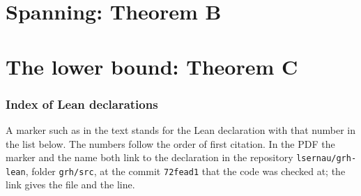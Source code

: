 \part{Spanning: Theorem B}


\part{The lower bound: Theorem C}



\appendix
{}

\section{Index of Lean declarations}\label{sec:app-leanindex}

A marker such as  in the text stands for the Lean declaration with that number in
the list below. The numbers follow the order of first citation. In the PDF the marker and the
name both link to the declaration in the repository \texttt{lsernau/grh-lean}, folder
\texttt{grh/src}, at the commit \texttt{72fead1} that the code was checked at; the link gives
the file and the line.

\printleanindex



